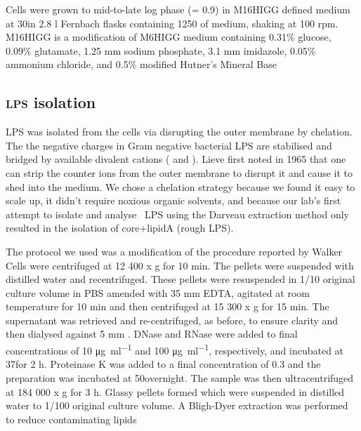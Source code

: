   Cells were grown to mid-to-late log phase (\od = 0.9) in M16HIGG defined medium at 30\cel in 2.8
  \si{\litre} Fernbach flasks containing 1250 \millilitre of medium, shaking at 100 rpm. M16HIGG is
  a modification of M6HIGG medium containing 0.31\% glucose, 0.09\%
  glutamate, 1.25 \si{\milli\meter} sodium phosphate, 3.1 \si{\milli\meter} imidazole, 0.05\%
  ammonium chloride, and 0.5\% modified Hutner's Mineral Base

	\subsection{\textsc{lps} isolation} %
	\label{sub:LPS_isolation}
  \ac{LPS} was isolated from the cells via disrupting the outer membrane by chelation.  The the
  negative charges in Gram negative bacterial \ac{LPS} are stabilised and bridged by available
  divalent cations (\ie{}  and ). Lieve first noted in 1965 that
  one can strip the counter ions from the outer membrane to disrupt it and cause it to shed into the
  medium. We chose a chelation strategy because we found it easy to scale up, it didn't require
  noxious organic solvents, and because our lab's first attempt to isolate and analyse \caulobacter\
  \ac{LPS} using the Darveau extraction method only
  resulted in the isolation of core+lipidA (rough \ac{LPS}).

  The protocol we used was a modification of the procedure reported by Walker
  \etal\!\upcite{walker94} Cells were centrifuged at 12 400 x g for 10 min. The pellets were
  suspended with distilled water and recentrifuged. These pellets were resuspended in 1/10 original
  culture volume in \ac{PBS}\upcite{maniatis} amended with 35 \si{\milli\meter} \ac{EDTA}, agitated
  at room temperature for 10 min and then centrifuged at 15 300 x g for 15 min. The supernatant was
  retrieved and re-centrifuged, as before, to ensure clarity and then dialysed against 5
  \si{\milli\meter} \ce{MgCl2}. DNase and RNase were added to final concentrations of 10
  \si{\micro\gram\per\milli\litre} and 100 \si{\micro\gram\per\milli\litre}\!, respectively, and
  incubated at 37\cel for 2 h. Proteinase K was added to a final concentration of 0.3 \mgperml and
  the preparation was incubated at 50\cel overnight. The sample was then ultracentrifuged at 184 000
  x g for 3 h. Glassy pellets formed which were suspended in distilled water to 1/100 original
  culture volume. A Bligh-Dyer extraction was performed to reduce contaminating
  lipids\upcite[.]{blighdyer}

